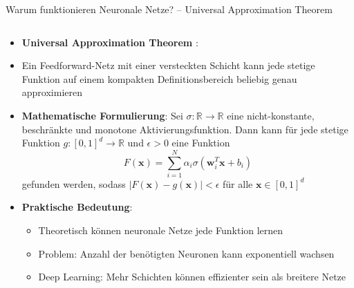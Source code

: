 \documentclass[aspectratio=1610, xcolor=dvipsnames, 9pt]{beamer}
\begin{document}
\begin{frame}{Warum funktionieren Neuronale Netze? -- Universal Approximation Theorem}
  \begin{columns}
    \begin{column}{1\textwidth}
      \begin{itemize}
        \item \textbf{Universal Approximation Theorem} \cite{cybenko1989,hornik1991}:
        \item Ein Feedforward-Netz mit einer versteckten Schicht kann jede stetige Funktion auf einem kompakten Definitionsbereich beliebig genau approximieren
        \item \textbf{Mathematische Formulierung}: Sei $\sigma: \mathbb{R} \to \mathbb{R}$ eine nicht-konstante, beschränkte und monotone Aktivierungsfunktion. Dann kann für jede stetige Funktion $g: [0,1]^d \to \mathbb{R}$ und $\epsilon > 0$ eine Funktion
        \begin{equation}
          F(\mathbf{x}) = \sum_{i=1}^N \alpha_i \sigma(\mathbf{w}_i^T \mathbf{x} + b_i)
        \end{equation}
        gefunden werden, sodass $|F(\mathbf{x}) - g(\mathbf{x})| < \epsilon$ für alle $\mathbf{x} \in [0,1]^d$
        \item \textbf{Praktische Bedeutung}: 
        \begin{itemize}
          \item Theoretisch können neuronale Netze jede Funktion lernen
          \item Problem: Anzahl der benötigten Neuronen kann exponentiell wachsen
          \item Deep Learning: Mehr Schichten können effizienter sein als breitere Netze
        \end{itemize}
      \end{itemize}
    \end{column}
  \end{columns}
\end{frame}
\end{document}
